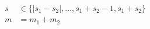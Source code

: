 

\vspace*{\fill}
\centering

\begin{align*}
    s &\in \{ |s_1-s_2|,\ldots,s_1+s_2-1,s_1+s_2 \} \\
    m &= m_1 + m_2
\end{align*}

\centering
\vspace*{\fill}


